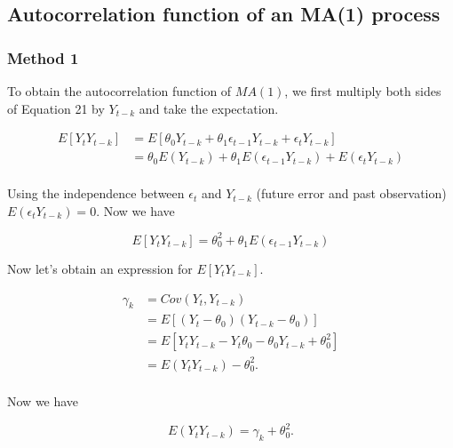 \documentclass[
  11pt,
  a4paper,
]{report}
\begin{document}
\subsection{Autocorrelation function of an MA(1)
process}\label{autocorrelation-function-of-an-ma1-process}

\subsubsection{Method 1}\label{method-1}

To obtain the autocorrelation function of \(MA(1)\), we first multiply
both sides of Equation 21 by \(Y_{t-k}\) and take the expectation.

\begin{equation}
\begin{aligned}
E[Y_tY_{t-k}] &= E[\theta_0 Y_{t-k} + \theta_1 \epsilon_{t-1} Y_{t-k} + \epsilon_t Y_{t-k}]\\
&= \theta_0 E(Y_{t-k}) + \theta_1 E(\epsilon_{t-1}Y_{t-k}) + E(\epsilon_t Y_{t-k})\\
\end{aligned}
\end{equation}

Using the independence between \(\epsilon_t\) and \(Y_{t-k}\) (future
error and past observation) \(E(\epsilon_t Y_{t-k}) = 0\). Now we have

\begin{equation}
E[Y_tY_{t-k}] = \theta_0^2  + \theta_1 E(\epsilon_{t-1}Y_{t-k}) 
\end{equation}

Now let's obtain an expression for \(E[Y_t Y_{t-k}]\).

\begin{equation}
\begin{aligned}
  \gamma_k &= Cov(Y_t, Y_{t-k}) \\
         &= E[(Y_t-\theta_0)(Y_{t-k}-\theta_0)] \\
         &= E[Y_tY_{t-k}-Y_t\theta_0-\theta_0 Y_{t-k} +\theta_0^2] \\
         &= E(Y_t Y_{t-k}) - \theta_0^2. \\
\end{aligned}
\end{equation}

Now we have

\begin{equation}
  E(Y_t Y_{t-k}) = \gamma_k + \theta_0^2.
\end{equation}
\end{document}
